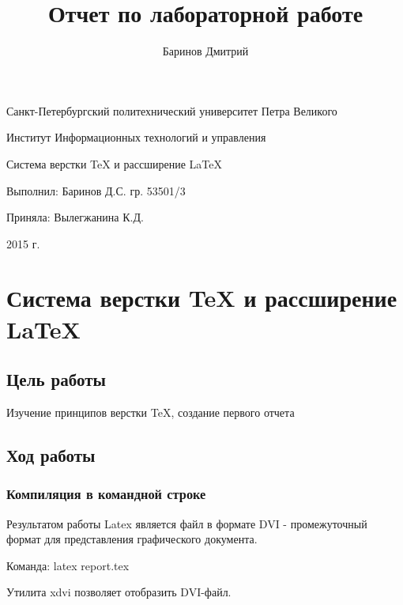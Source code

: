 \documentclass[a4paper, 12pt]{article}
\author{Баринов Дмитрий}
\title{Отчет по лабораторной работе}
\begin{document}
\begin{titlepage} \begin{center}

	\Large			
Санкт-Петербургский политехнический университет Петра Великого
			
	\vspace{0.2cm}	
Институт Информационных технологий и управления

	\vspace{2cm} \vfill \huge
Система верстки \TeX{} и рассширение \LaTeX{}

\vfill 

\begin{flushleft} \large \hangindent=8cm 
Выполнил: Баринов Д.С. гр. 53501/3 \hrulefill

Приняла: Вылегжанина К.Д. \hrulefill
\end{flushleft}

		
\vspace{2cm} \vfill \large
2015 г.
		

\end{center} \end{titlepage}

\newpage

\section{Система верстки \TeX{} и рассширение \LaTeX{}}

\subsection{Цель работы}

Изучение принципов верстки \TeX{}, создание первого отчета 

\subsection{Ход работы}

\subsubsection{Компиляция в командной строке}


Результатом работы Latex является файл в формате DVI - промежуточный формат для представления графического документа.

Команда: latex report.tex

Утилита xdvi позволяет отобразить DVI-файл.
\end{document}
